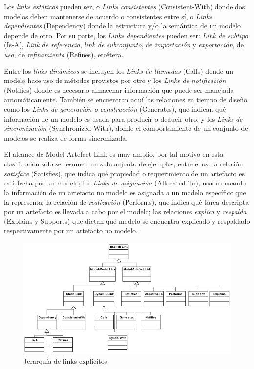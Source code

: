 \documentclass[a4paper,12pt,twoside,spanish,openright]{book}
\begin{document}
Los \textit{links estáticos} pueden ser, o \textit{Links consistentes} (\textsf{Consistent-With}) donde dos modelos deben mantenerse de acuerdo o consistentes entre sí, o \textit{Links dependientes} (\textsf{Dependency}) donde la estructura y/o la semántica de un modelo depende de otro. Por su parte, los \textit{Links dependientes} pueden ser: \textit{Link de subtipo} (\textsf{Is-A}), \textit{Link de referencia}, \textit{link de subconjunto}, de \textit{importación} y \textit{exportación}, de \textit{uso}, de \textit{refinamiento} (\textsf{Refines}), etcétera.

Entre los \textit{links dinámicos} se incluyen los \textit{Links de llamadas} (\textsf{Calls}) donde un modelo hace uso de métodos provistos por otro y los \textit{Links de notificación} (\textsf{Notifies}) donde es necesario almacenar información que puede ser manejada automáticamente. También se encuentran aquí las relaciones en tiempo de diseño como los \textit{Links de generación o construcción} (\textsf{Generates}), que indican qué información de un modelo es usada para producir o deducir otro, y los \textit{Links de sincronización} (\textsf{Synchronized With}), donde el comportamiento de un conjunto de modelos se realiza de forma sincronizada.

El alcance de \textsf{Model-Artefact Link} es muy amplio, por tal motivo en esta clasificación sólo se resumen un subconjunto de ejemplos, entre ellos: la relación \textit{satisface} (\textsf{Satisfies}), que indica qué propiedad o requerimiento de un artefacto es satisfecha por un modelo; los \textit{Links de asignación} (\textsf{Allocated-To}), usados cuando la información de un artefacto no modelo es asignada a un modelo específico que la representa; la relación de \textit{realización} (\textsf{Performs}), que indica qué tarea descripta por un artefacto es llevada a cabo por el modelo; las relaciones \textit{explica} y \textit{respalda} (\textsf{Explains} y \textsf{Supports}) que dictan qué modelo se encuentra explicado y respaldado respectivamente por un artefacto no modelo.

\begin{figure}[hbtp]
\centering
\includegraphics[scale=0.52]{./img/ExplicitTraceLinks}
\caption{Jerarquía de links explícitos}
\label{fig:LinksExplicitos}
\end{figure}
\end{document}
